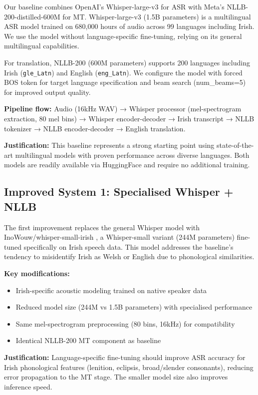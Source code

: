 \documentclass[11pt]{article}
\begin{document}
Our baseline combines OpenAI's Whisper-large-v3 \citep{radford2023whisper,whisper-large-v3} for ASR with Meta's NLLB-200-distilled-600M \citep{nllb2022,nllb-distilled} for MT. 
Whisper-large-v3 (1.5B parameters) is a multilingual ASR model trained on 680,000 hours of audio across 99 languages including Irish. We use the model without language-specific fine-tuning, 
relying on its general multilingual capabilities.

For translation, NLLB-200 (600M parameters) supports 200 languages including Irish (\texttt{gle\_Latn}) and English (\texttt{eng\_Latn}). We configure the model with forced BOS token for 
target language specification and beam search (num\_beams=5) for improved output quality.

\textbf{Pipeline flow:} Audio (16kHz WAV) → Whisper processor (mel-spectrogram extraction, 80 mel bins) → Whisper encoder-decoder → Irish transcript → NLLB tokenizer → NLLB encoder-decoder 
→ English translation.

\textbf{Justification:} This baseline represents a strong starting point using state-of-the-art multilingual models with proven performance across diverse languages. Both models are 
readily available via HuggingFace and require no additional training.

\subsection{Improved System 1: Specialised Whisper + NLLB}

The first improvement replaces the general Whisper model with InoWouw/whisper-small-irish \citep{whisper-small-irish}, a Whisper-small variant (244M parameters) fine-tuned specifically 
on Irish speech data. This model addresses the baseline's tendency to misidentify Irish as Welsh or English due to phonological similarities.

\textbf{Key modifications:}
\begin{itemize}
\item Irish-specific acoustic modeling trained on native speaker data
\item Reduced model size (244M vs 1.5B parameters) with specialised performance
\item Same mel-spectrogram preprocessing (80 bins, 16kHz) for compatibility
\item Identical NLLB-200 MT component as baseline
\end{itemize}

\textbf{Justification:} Language-specific fine-tuning should improve ASR accuracy for Irish phonological features (lenition, eclipsis, broad/slender consonants), reducing error propagation to the MT 
stage. The smaller model size also improves inference speed.
\end{document}
